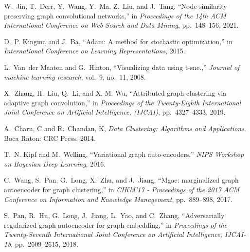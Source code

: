 \documentclass{article}
\begin{document}
\begin{thebibliography}{10}
W.~Jin, T.~Derr, Y.~Wang, Y.~Ma, Z.~Liu, and J.~Tang, ``Node similarity
  preserving graph convolutional networks,'' in {\em Proceedings of the 14th
  ACM International Conference on Web Search and Data Mining}, pp.~148--156,
  2021.

D.~P. Kingma and J.~Ba, ``Adam: A method for stochastic optimization,'' in {\em
  International Conference on Learning Representations}, 2015.

L.~Van~der Maaten and G.~Hinton, ``Visualizing data using t-sne.,'' {\em
  Journal of machine learning research}, vol.~9, no.~11, 2008.
  
X.~Zhang, H.~Liu, Q.~Li, and X.-M. Wu, ``Attributed graph clustering via
  adaptive graph convolution,'' in {\em Proceedings of the Twenty-Eighth
  International Joint Conference on Artificial Intelligence, (IJCAI)},
  pp.~4327--4333, 2019.
  
A.~Charu, C and R.~Chandan, K, {\em Data Clustering: Algorithms and
  Applications}.
\newblock Boca Raton: CRC Press, 2014.

T.~N. Kipf and M.~Welling, ``Variational graph auto-encoders,'' {\em NIPS
  Workshop on Bayesian Deep Learning}, 2016.

C.~Wang, S.~Pan, G.~Long, X.~Zhu, and J.~Jiang, ``Mgae: marginalized graph
  autoencoder for graph clustering,'' in {\em CIKM'17 - Proceedings of the 2017
  ACM Conference on Information and Knowledge Management}, pp.~889--898, 2017.

S.~Pan, R.~Hu, G.~Long, J.~Jiang, L.~Yao, and C.~Zhang, ``Adversarially
  regularized graph autoencoder for graph embedding,'' in {\em Proceedings of
  the Twenty-Seventh International Joint Conference on Artificial Intelligence,
  {IJCAI-18}}, pp.~2609--2615, 2018.
  
\end{thebibliography}
\end{document}
